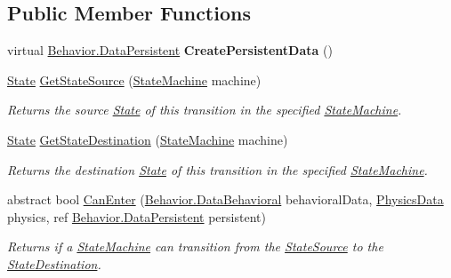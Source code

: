 \subsection*{Public Member Functions}
\begin{DoxyCompactItemize}
\item 
\hypertarget{class_skyrates_1_1_a_i_1_1_state_1_1_state_transition_a7adfa94373a575af09f86e8f1161a3a8}{virtual \hyperlink{class_skyrates_1_1_a_i_1_1_behavior_1_1_data_persistent}{Behavior.\-Data\-Persistent} {\bfseries Create\-Persistent\-Data} ()}\label{class_skyrates_1_1_a_i_1_1_state_1_1_state_transition_a7adfa94373a575af09f86e8f1161a3a8}

\item 
\hyperlink{class_skyrates_1_1_a_i_1_1_state_1_1_state}{State} \hyperlink{class_skyrates_1_1_a_i_1_1_state_1_1_state_transition_a8bcaa16b736b8d240dfbeaafe8aaddc0}{Get\-State\-Source} (\hyperlink{class_skyrates_1_1_a_i_1_1_state_1_1_state_machine}{State\-Machine} machine)
\begin{DoxyCompactList}\small\item\em Returns the source \hyperlink{class_skyrates_1_1_a_i_1_1_state_1_1_state}{State} of this transition in the specified \hyperlink{class_skyrates_1_1_a_i_1_1_state_1_1_state_machine}{State\-Machine}. \end{DoxyCompactList}\item 
\hyperlink{class_skyrates_1_1_a_i_1_1_state_1_1_state}{State} \hyperlink{class_skyrates_1_1_a_i_1_1_state_1_1_state_transition_ae599613de8997bb20df235f616485957}{Get\-State\-Destination} (\hyperlink{class_skyrates_1_1_a_i_1_1_state_1_1_state_machine}{State\-Machine} machine)
\begin{DoxyCompactList}\small\item\em Returns the destination \hyperlink{class_skyrates_1_1_a_i_1_1_state_1_1_state}{State} of this transition in the specified \hyperlink{class_skyrates_1_1_a_i_1_1_state_1_1_state_machine}{State\-Machine}. \end{DoxyCompactList}\item 
abstract bool \hyperlink{class_skyrates_1_1_a_i_1_1_state_1_1_state_transition_a774f9f4ee740450b5b41f565f158be88}{Can\-Enter} (\hyperlink{class_skyrates_1_1_a_i_1_1_behavior_1_1_data_behavioral}{Behavior.\-Data\-Behavioral} behavioral\-Data, \hyperlink{class_skyrates_1_1_physics_1_1_physics_data}{Physics\-Data} physics, ref \hyperlink{class_skyrates_1_1_a_i_1_1_behavior_1_1_data_persistent}{Behavior.\-Data\-Persistent} persistent)
\begin{DoxyCompactList}\small\item\em Returns if a \hyperlink{class_skyrates_1_1_a_i_1_1_state_1_1_state_machine}{State\-Machine} can transition from the \hyperlink{class_skyrates_1_1_a_i_1_1_state_1_1_state_transition_a15c97c73b5e83f2bda77c5f4fb2521c6}{State\-Source} to the \hyperlink{class_skyrates_1_1_a_i_1_1_state_1_1_state_transition_a445177b14011fbc85aec78ecd04680f8}{State\-Destination}. \end{DoxyCompactList}\item 

\end{DoxyCompactItemize}
